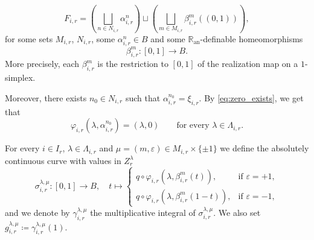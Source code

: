 \documentclass[a4paper,11pt,reqno]{amsart}
\theoremstyle{plain}
\theoremstyle{definition}
\newcommand{\Ran}{\mathbb R_{\mathrm{an}}}
\begin{document}
\begin{equation*}
    F_{i,r} = \left( \bigsqcup_{n \in N_{i,r}} \alpha^n_{i,r} \right) \sqcup \left( \bigsqcup_{m \in M_{i,r}} \beta^m_{i,r}((0,1)) \right),
\end{equation*}
for some sets $M_{i,r}$, $N_{i,r}$, some $\alpha^n_{i,r} \in B$ and some $\Ran$-definable homeomorphisms
\[
\beta^m_{i,r} \colon [0,1] \to B.
\]
More precisely, each $\beta^m_{i,r}$ is the restriction to $[0,1]$ of the realization map on a $1$-simplex.

Moreover, there exists $n_0\in N_{i,r}$ such that $\alpha^{n_0}_{i,r}=\xi_{i,r}$. By \eqref{eq:zero_exists}, we get that
\[
\varphi_{i,r}(\lambda,\alpha^{n_0}_{i,r})=(\lambda,0)
\qquad\text{for every }\lambda\in \Lambda_{i,r}.
\]

    For every $i \in I_r$, $\lambda \in \Lambda_{i,r}$ and $\mu = (m,\varepsilon) \in M_{i,r} \times \{\pm1\}$ we define the absolutely continuous curve with values in $Z^\lambda_r$
    \begin{equation*}
        \sigma^{\lambda,\mu}_{i,r} \colon [0,1] \to B, \quad t \mapsto \begin{cases}
        q \circ \varphi_{i,r}(\lambda, \beta^m_{i,r}(t)), & \text{if $\varepsilon = +1$}, \\
        q \circ \varphi_{i,r}(\lambda, \beta^m_{i,r}(1-t)), & \text{if $\varepsilon = -1$},
        \end{cases}
    \end{equation*}
    and we denote by $\gamma^{\lambda,\mu}_{i,r}$ the multiplicative integral of $\sigma^{\lambda,\mu}_{i,r}$. We also set $g^{\lambda,\mu}_{i,r} \coloneq   \gamma^{\lambda,\mu}_{i,r}(1)$.
    
\end{document}
